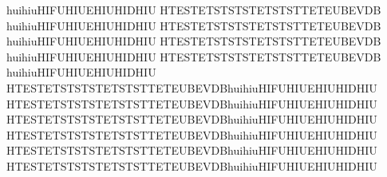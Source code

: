 huihiuHIFUHIUEHIUHIDHIU HTESTETSTSTSTETSTSTTETEUBEVDB\\
huihiuHIFUHIUEHIUHIDHIU HTESTETSTSTSTETSTSTTETEUBEVDB\\
huihiuHIFUHIUEHIUHIDHIU HTESTETSTSTSTETSTSTTETEUBEVDB\\
huihiuHIFUHIUEHIUHIDHIU HTESTETSTSTSTETSTSTTETEUBEVDB\\
huihiuHIFUHIUEHIUHIDHIU HTESTETSTSTSTETSTSTTETEUBEVDBhuihiuHIFUHIUEHIUHIDHIU HTESTETSTSTSTETSTSTTETEUBEVDBhuihiuHIFUHIUEHIUHIDHIU HTESTETSTSTSTETSTSTTETEUBEVDBhuihiuHIFUHIUEHIUHIDHIU HTESTETSTSTSTETSTSTTETEUBEVDBhuihiuHIFUHIUEHIUHIDHIU HTESTETSTSTSTETSTSTTETEUBEVDBhuihiuHIFUHIUEHIUHIDHIU HTESTETSTSTSTETSTSTTETEUBEVDBhuihiuHIFUHIUEHIUHIDHIU 